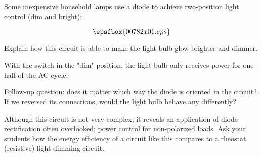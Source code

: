

Some inexpensive household lamps use a diode to achieve two-position light control (dim and bright):

$$\epsfbox{00782x01.eps}$$

Explain how this circuit is able to make the light bulb glow brighter and dimmer.







With the switch in the "dim" position, the light bulb only receives power for one-half of the AC cycle.

\vskip 10pt

Follow-up question: does it matter which way the diode is oriented in the circuit?  If we reversed its connections, would the light bulb behave any differently?







Although this circuit is not very complex, it reveals an application of diode rectification often overlooked: power control for non-polarized loads.  Ask your students how the energy efficiency of a circuit like this compares to a rheostat (resistive) light dimming circuit.




